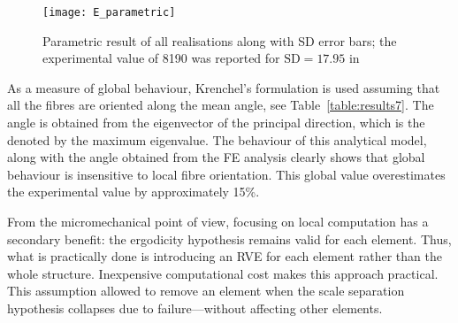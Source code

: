 \begin{figure}[!h]{}
  	\centering
  	\texttt{[image: E\_parametric]}
	\caption{Parametric result of all realisations along with SD error bars; the experimental value of 8190 was reported for $\text{SD}=17.95$ in~\autocite{Virk.2013}}
	\label{fig:mesh_param}
\end{figure}%
	
	As a measure of global behaviour, Krenchel's formulation is used assuming that all the fibres are oriented along the mean angle, see Table~\ref{table:results7}. The angle is obtained from the eigenvector of the principal direction, which is the denoted by the maximum eigenvalue. The behaviour of this analytical model, along with the angle obtained from the FE analysis clearly shows that global behaviour is insensitive to local fibre orientation. This global value overestimates the experimental value by approximately 15\%.
	
	From the micromechanical point of view, focusing on local computation has a secondary benefit: the ergodicity hypothesis remains valid for each element. Thus, what is practically done is introducing an RVE for each element rather than the whole structure. Inexpensive computational cost makes this approach practical. This assumption allowed to remove an element when the scale separation hypothesis collapses due to failure---without affecting other elements.	


